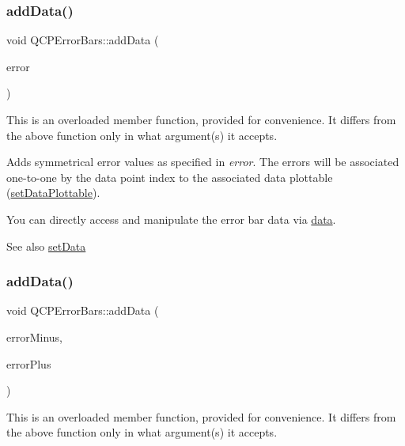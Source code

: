 \subsubsection{\texorpdfstring{add\+Data()}{addData()}\hspace{0.1cm}{\footnotesize\ttfamily [1/4]}}
{\footnotesize\ttfamily void Q\+C\+P\+Error\+Bars\+::add\+Data (\begin{DoxyParamCaption}\item[{const \hyperlink{class_q_vector}{Q\+Vector}$<$ double $>$ \&}]{error }\end{DoxyParamCaption})}

This is an overloaded member function, provided for convenience. It differs from the above function only in what argument(s) it accepts.

Adds symmetrical error values as specified in {\itshape error}. The errors will be associated one-\/to-\/one by the data point index to the associated data plottable (\hyperlink{class_q_c_p_error_bars_aabb42a964cfbf780cd1c79850c7cd989}{set\+Data\+Plottable}).

You can directly access and manipulate the error bar data via \hyperlink{class_q_c_p_error_bars_aeebd1b14f4c3573565efafd514988813}{data}.

\begin{DoxySeeAlso}{See also}
\hyperlink{class_q_c_p_error_bars_a92b1980003255f5f7c05407a4d92aabc}{set\+Data} 
\end{DoxySeeAlso}
\mbox{\label{class_q_c_p_error_bars_a2135cf41d7925a3dcdadd4eb03fd3eb6}} 
\subsubsection{\texorpdfstring{add\+Data()}{addData()}\hspace{0.1cm}{\footnotesize\ttfamily [2/4]}}
{\footnotesize\ttfamily void Q\+C\+P\+Error\+Bars\+::add\+Data (\begin{DoxyParamCaption}\item[{const \hyperlink{class_q_vector}{Q\+Vector}$<$ double $>$ \&}]{error\+Minus,  }\item[{const \hyperlink{class_q_vector}{Q\+Vector}$<$ double $>$ \&}]{error\+Plus }\end{DoxyParamCaption})}

This is an overloaded member function, provided for convenience. It differs from the above function only in what argument(s) it accepts.

